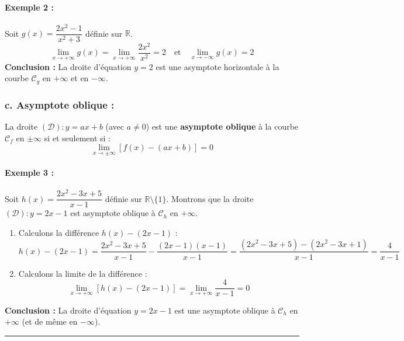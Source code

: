 \documentclass[12pt,a4paper]{article}
\begin{document}
\paragraph{Exemple 2 :} Soit $g(x) = \dfrac{2x^2 - 1}{x^2 + 3}$ définie sur $\mathbb{R}$.
\[
\lim_{x \to +\infty} g(x) = \lim_{x \to +\infty} \frac{2x^2}{x^2} = 2 \quad \text{et} \quad \lim_{x \to -\infty} g(x) = 2
\]
\textbf{Conclusion :} La droite d'équation $y = 2$ est une asymptote horizontale à la courbe $\mathcal{C}_g$ en $+\infty$ et en $-\infty$.

\subsubsection*{\color{myred}c. Asymptote oblique :}

\begin{center}
    \begin{tcolorbox}[colback=blue!5!white,colframe=myblue,title=\textbf{Définition : Asymptote oblique}]
La droite $(\mathcal{D}) : y = ax + b$ (avec $a \neq 0$) est une \textbf{asymptote oblique} à la courbe $\mathcal{C}_f$ en $\pm\infty$ si et seulement si :
\[
\lim_{x \to \pm\infty} [f(x) - (ax + b)] = 0
\]
\end{tcolorbox}
\end{center}

\paragraph{Exemple 3 :} Soit $h(x) = \dfrac{2x^2 - 3x + 5}{x - 1}$ définie sur $\mathbb{R} \setminus \{1\}$.
Montrons que la droite $(\mathcal{D}) : y = 2x - 1$ est asymptote oblique à $\mathcal{C}_h$ en $+\infty$.
\begin{enumerate}
    \item Calculons la différence $h(x) - (2x - 1)$ :
    \[
    h(x) - (2x - 1) = \frac{2x^2 - 3x + 5}{x - 1} - \frac{(2x - 1)(x - 1)}{x - 1} = \frac{(2x^2 - 3x + 5) - (2x^2 - 3x + 1)}{x - 1} = \frac{4}{x - 1}
    \]
    \item Calculons la limite de la différence :
    \[
    \lim_{x \to +\infty} [h(x) - (2x - 1)] = \lim_{x \to +\infty} \frac{4}{x - 1} = 0
    \]
\end{enumerate}
\textbf{Conclusion :} La droite d'équation $y = 2x - 1$ est une asymptote oblique à $\mathcal{C}_h$ en $+\infty$ (et de même en $-\infty$).

\vspace{0.3cm}
\hrule
\vspace{0.3cm}
\end{document}
